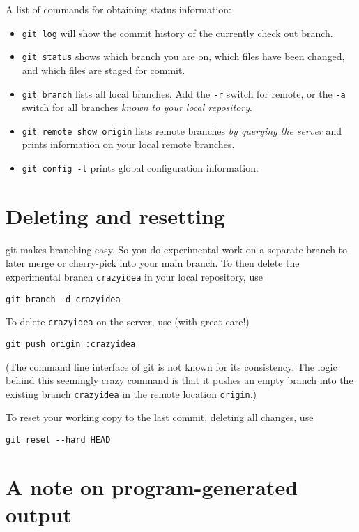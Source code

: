 \documentclass[twocolumn,secnumarabic,rmp]{revtex4}
\begin{document}
A list of commands for obtaining status information:
\begin{itemize}
\item \verb+git log+ will show the commit history of the currently
check out branch.
\item \verb+git status+ shows which branch you are on, which files
have been changed, and which files are staged for commit.

\item \verb+git branch+ lists all local branches.  Add the \verb+-r+
switch for remote, or the \verb+-a+ switch for all branches
\emph{known to your local repository}.

\item \verb+git remote show origin+ lists remote branches \emph{by
querying the server} and prints information on your local remote
branches.   

\item \verb+git config -l+ prints global configuration information.

\end{itemize}
\vfill
\section{Deleting and resetting}

\textsf{git} makes branching easy.  So you do experimental work on a
separate branch to later merge or cherry-pick into your main branch.
To then delete the experimental branch \verb+crazyidea+ in your local
repository, use
\begin{verbatim}
git branch -d crazyidea
\end{verbatim}
To delete \verb+crazyidea+ on the server, use (with great
care!)
\begin{verbatim}
git push origin :crazyidea
\end{verbatim}
(The command line interface of \textsf{git} is not known for its
consistency.  The logic behind this seemingly crazy command is that it
pushes an empty branch into the existing branch \verb+crazyidea+ in
the remote location \verb+origin+.)

To reset your working copy to the last commit, deleting all changes,
use
\begin{verbatim}
git reset --hard HEAD
\end{verbatim}




\section{A note on program-generated output}
\end{document}
